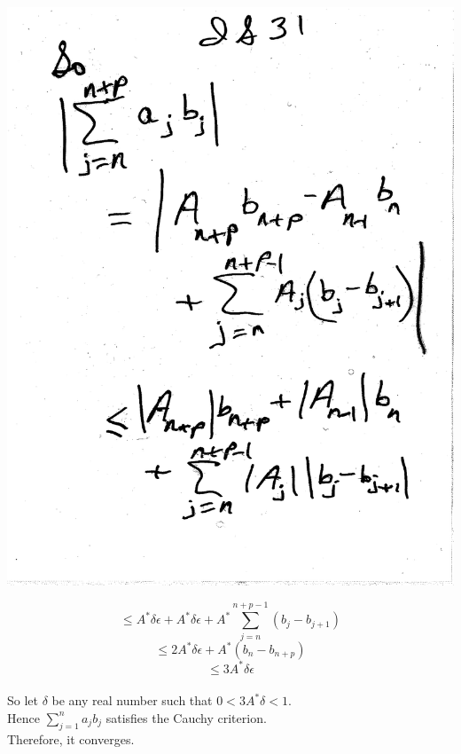 \documentclass[10pt,a4paper]{article}
\begin{document}
\includegraphics[scale=.5]{Pages/IS_31}

\newpage

$$\leq A^*\delta\epsilon + A^*\delta\epsilon + A^*\sum_{j=n}^{n+p-1} (b_j - b_{j+1})$$
$$ \leq 2A^*\delta\epsilon + A^*(b_n - b_{n+p})$$
$$ \leq 3A^*\delta\epsilon$$
\\ \noindent So let $\delta$ be any real number such that $0 < 3A^*\delta < 1$.
\\ \noindent Hence $\sum_{j=1}^n a_j b_j$ satisfies the Cauchy criterion. 
\\ Therefore, it converges.
\end{document}

